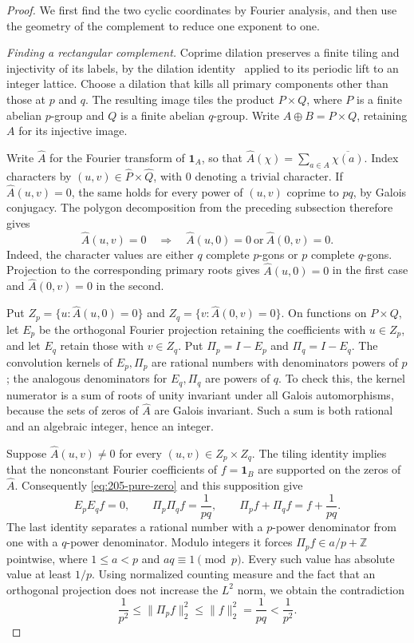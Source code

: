\documentclass[11pt,reqno]{amsart}
\newcommand{\Z}{\mathbb Z}
\newcommand{\one}{\mathbf 1}
\theoremstyle{definition}
\theoremstyle{remark}
\numberwithin{equation}{section}
\begin{document}
\begin{proof}
We first find the two cyclic coordinates by Fourier analysis, and then
use the geometry of the complement to reduce one exponent to one.

\emph{Finding a rectangular complement.}
Coprime dilation preserves a finite tiling and injectivity of its labels,
by the dilation identity~\cite[Theorem~8]{HK} applied to its periodic
lift to an integer lattice. Choose a dilation that kills all primary
components other than those at $p$ and $q$.
The resulting image tiles the product $P\times Q$, where $P$ is a
finite abelian $p$-group and $Q$ is a finite abelian $q$-group.
Write $A\oplus B=P\times Q$, retaining $A$ for its injective image.

Write $\widehat A$ for the Fourier transform of $\one_A$, so that
$\widehat A(\chi)=\sum_{a\in A}\overline{\chi(a)}$.
Index characters by $(u,v)\in\widehat P\times\widehat Q$, with $0$
denoting a trivial character. If $\widehat A(u,v)=0$, the same holds
for every power of $(u,v)$ coprime to $pq$, by Galois conjugacy.
The polygon decomposition from the preceding subsection therefore gives
\begin{equation}\label{eq:205-pure-zero}
 \widehat A(u,v)=0\quad\Longrightarrow\quad
 \widehat A(u,0)=0\ \text{or}\ \widehat A(0,v)=0.
\end{equation}
Indeed, the character values are either $q$ complete $p$-gons or
$p$ complete $q$-gons. Projection to the corresponding primary roots
gives $\widehat A(u,0)=0$ in the first case and
$\widehat A(0,v)=0$ in the second.

Put $Z_p=\{u:\widehat A(u,0)=0\}$ and
$Z_q=\{v:\widehat A(0,v)=0\}$.
On functions on $P\times Q$, let $E_p$ be the orthogonal Fourier
projection retaining the coefficients with $u\in Z_p$, and let $E_q$
retain those with $v\in Z_q$. Put $\Pi_p=I-E_p$ and $\Pi_q=I-E_q$.
The convolution kernels of $E_p,\Pi_p$ are rational numbers with
denominators powers of $p$; the analogous denominators for $E_q,\Pi_q$
are powers of $q$. To check this, the kernel numerator is a sum of
roots of unity invariant under all Galois automorphisms, because the
sets of zeros of $\widehat A$ are Galois invariant. Such a sum
is both rational and an algebraic integer, hence an integer.

Suppose $\widehat A(u,v)\ne0$ for every $(u,v)\in Z_p\times Z_q$.
The tiling identity implies that the nonconstant Fourier coefficients
of $f=\one_B$ are supported on the zeros of $\widehat A$.
Consequently \eqref{eq:205-pure-zero} and this supposition give
\[
 E_pE_qf=0,\qquad \Pi_p\Pi_qf=\frac1{pq},\qquad
 \Pi_pf+\Pi_qf=f+\frac1{pq}.
\]
The last identity separates a rational number with a $p$-power
denominator from one with a $q$-power denominator. Modulo integers
it forces $\Pi_pf\in a/p+\Z$ pointwise, where $1\le a<p$ and
$aq\equiv1\pmod p$. Every such value has absolute value at least $1/p$.
Using normalized counting measure and the fact that an orthogonal
projection does not increase the $L^2$ norm, we obtain the contradiction
\[
 \frac1{p^2}\le\|\Pi_pf\|_2^2\le\|f\|_2^2
 =\frac1{pq}<\frac1{p^2}.
\]


\end{proof}
\end{document}
